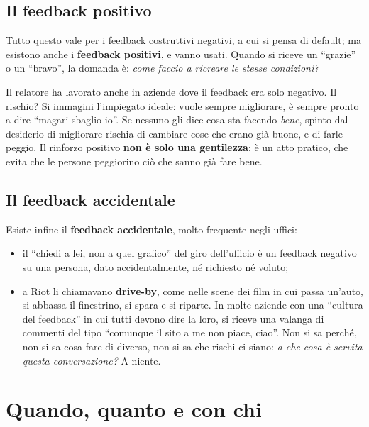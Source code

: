 \subsection{Il feedback positivo}

Tutto questo vale per i feedback costruttivi negativi, a cui si pensa di
default; ma esistono anche i \textbf{feedback positivi}, e vanno usati. Quando
si riceve un ``grazie'' o un ``bravo'', la domanda è: \emph{come faccio a
ricreare le stesse condizioni?}

Il relatore ha lavorato anche in aziende dove il feedback era solo negativo.
Il rischio? Si immagini l'impiegato ideale: vuole sempre migliorare, è sempre
pronto a dire ``magari sbaglio io''. Se nessuno gli dice cosa sta facendo
\emph{bene}, spinto dal desiderio di migliorare rischia di cambiare cose che
erano già buone, e di farle peggio. Il rinforzo positivo \textbf{non è solo una
gentilezza}: è un atto pratico, che evita che le persone peggiorino ciò che
sanno già fare bene.

\subsection{Il feedback accidentale}

Esiste infine il \textbf{feedback accidentale}, molto frequente negli uffici:
\begin{itemize}
  \item il ``chiedi a lei, non a quel grafico'' del giro dell'ufficio è un
        feedback negativo su una persona, dato accidentalmente, né richiesto
        né voluto;
  \item a Riot li chiamavano \textbf{drive-by}, come nelle scene dei film in
        cui passa un'auto, si abbassa il finestrino, si spara e si riparte. In
        molte aziende con una ``cultura del feedback'' in cui tutti devono
        dire la loro, si riceve una valanga di commenti del tipo ``comunque il
        sito a me non piace, ciao''. Non si sa perché, non si sa cosa fare di
        diverso, non si sa che rischi ci siano: \emph{a che cosa è servita
        questa conversazione?} A niente.
\end{itemize}

\section{Quando, quanto e con chi}
\label{sec:z1-quando}

